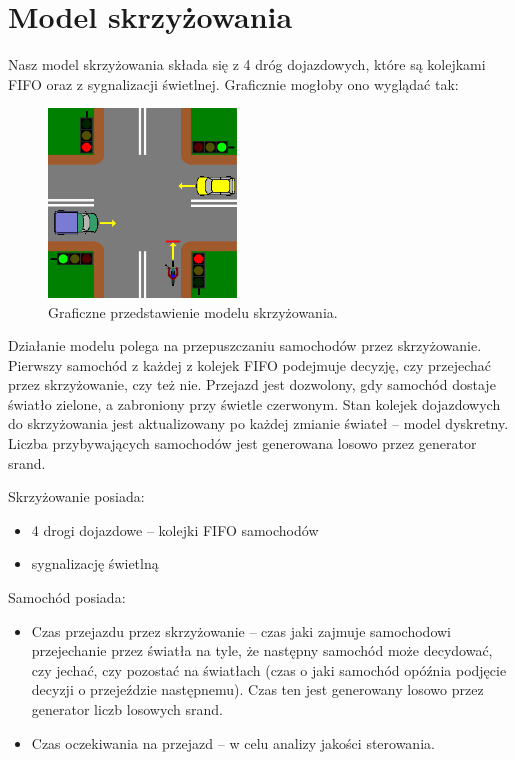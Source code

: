 \documentclass[11pt]{aghdpl}
\author{Żaneta Błaszczuk, Rafał Kozik, Filip Kubicz, Jakub Nowak, Jakub Porębski}
\date{2014}
\begin{document}
\titlepages

\section{Model skrzyżowania}
Nasz model skrzyżowania składa się z 4 dróg dojazdowych, które są kolejkami FIFO oraz z sygnalizacji świetlnej. Graficznie mogłoby ono wyglądać tak: 

\begin{figure}[h!]
	\centering
	\includegraphics[width=50mm]{model.png}
	\caption{Graficzne przedstawienie modelu skrzyżowania.}	
	\label{model}
\end{figure} 

Działanie modelu polega na przepuszczaniu samochodów przez skrzyżowanie.  Pierwszy samochód z każdej z kolejek FIFO podejmuje decyzję, czy przejechać przez skrzyżowanie, czy też nie. Przejazd jest dozwolony, gdy  samochód dostaje światło zielone, a zabroniony przy świetle czerwonym.
Stan kolejek dojazdowych do skrzyżowania jest aktualizowany po każdej zmianie świateł -- model dyskretny. Liczba przybywających samochodów jest generowana losowo przez generator srand.

Skrzyżowanie posiada:
\begin{itemize}
	\item 4 drogi dojazdowe -- kolejki FIFO samochodów
	\item sygnalizację świetlną
\end{itemize}

Samochód posiada:
\begin{itemize}
	\item Czas przejazdu przez skrzyżowanie -- czas jaki zajmuje samochodowi przejechanie przez światła na tyle, że następny samochód może decydować, czy jechać, czy pozostać na światłach (czas o jaki samochód opóźnia podjęcie decyzji o przejeździe następnemu).
	Czas ten jest generowany losowo przez generator liczb losowych srand.
	\item Czas oczekiwania na przejazd -- w celu analizy jakości sterowania.
\end{itemize}
\end{document}
